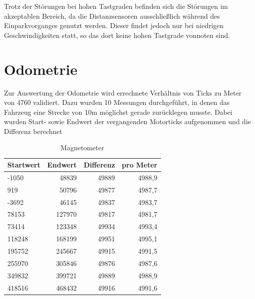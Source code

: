 
Trotz der Störungen bei hohen Tastgraden befinden sich die Störungen im akzeptablen Bereich, da die Distanzsensoren ausschließlich während des Einparkvorganges
genutzt werden. Dieser findet jedoch nur bei niedrigen Geschwindigkeiten statt, so das dort keine hohen Tastgrade vonnoten sind.


\section{Odometrie}
Zur Auswertung der Odometrie wird errechnete Verhältnis von Ticks zu Meter von 4760 validiert. Dazu wurden 10 Messungen durchgeführt, in denen das Fahrzeug
eine Strecke von 10m möglichst gerade zurücklegen musste. Dabei wurden Start- sowie Endwert der vergangenden Motorticks aufgenommen und die Differenz berechnet

\begin{table}[H]
  \centering
  \begin{tabularx}{\textwidth}{|X|r|r|r|}
    \hline
     Startwert & Endwert & Differenz  & pro Meter \\ \hline \hline
    -1050	& 48839		& 49889	& 4988,9\\ \hline
      919	& 50796		& 49877	& 4987,7\\ \hline
    -3692	& 46145		& 49837	& 4983,7\\ \hline
    78153	& 127970	& 49817	& 4981,7\\ \hline
    73414	& 123348	& 49934	& 4993,4\\ \hline
    118248	& 168199	& 49951	& 4995,1\\ \hline
    195752	& 245667	& 49915	& 4991,5\\ \hline
    255970	& 305846	& 49876	& 4987,6\\ \hline
    349832	& 399721	& 49889	& 4988,9\\ \hline
    418516	& 468432	& 49916	& 4991,6\\ \hline
  \end{tabularx}
  \caption{Magnetometer}%
  \label{tab:odom}
\end{table}

